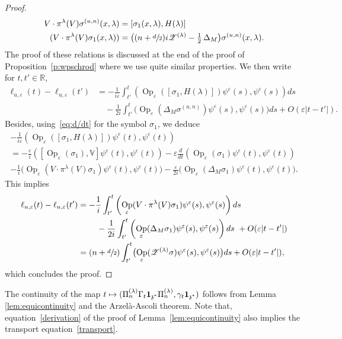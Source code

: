 \documentclass[10pt]{amsart}
\let\mathcal\mathscr
\newcommand\mto{\mathchoice{\longmapsto}{\mapsto}{\mapsto}{\mapsto}}
\newcommand{\bun}{\mathbf{1}}
\DeclareMathOperator{\Op}{Op}
\theoremstyle{plain}
\theoremstyle{definition}
\let\eps\varepsilon
\def\R{{\mathbb R}}
\def\bbV{{\mathbb V}}
\begin{document}
\begin{proof}
\begin{align}
V\cdot \pi^\lambda(V)\sigma^{(u,n)}(x,\lambda)&= [\sigma_1(x,\lambda), H(\lambda)] \label{e:offdiag5}\\
(V\cdot \pi^\lambda(V) \sigma_1(x,\lambda)) &= \bigl((n+\sfrac d2)	i {\mathcal Z}^{(\lambda)} - \tfrac 12\, \Delta_M\bigr) \sigma^{(u,n)}(x,\lambda).	\nonumber
\end{align}
The proof of these relations is discussed at the end of the proof of Proposition~\ref{p:wpschrod} where we use quite similar properties.
We then write for $t,t'\in\R$,
\begin{align*}
\ell_{u,\eps}(t)-\ell_{u,\eps}(t') &= -\frac 1 {i\eps} \int_{t'}^t
\left(\Op_\eps([ \sigma_1,H(\lambda)])\psi^\eps(s),\psi^\eps(s)\right)ds\\
&\quad -\frac 1{2i}
\int_{t'}^t
\bigl(\Op_\eps(\Delta_M \sigma^{(u,n)}) \psi^\eps(s),\psi^\eps(s)\bigr)ds +O(\eps |t-t'|).
\end{align*}
Besides, using~\eqref{eq:d/dt} for the symbol $\sigma_1$, we deduce
\begin{multline*}
-\frac 1{i\eps} \left(\Op_\eps([ \sigma_1,H(\lambda)])\psi^\eps(t),\psi^\eps(t)\right)\\
=-\frac \eps {i} \left([\Op_\eps(\sigma_1),\bbV] \psi^\eps(t),\psi^\eps(t)\right)
-\eps \frac d{dt} \left(\Op_\eps(\sigma_1) \psi^\eps(t),\psi^\eps(t)\right) \\
-\frac 1 i \bigl(\Op_\eps(V\cdot \pi^\lambda(V) \sigma_1) \psi^\eps(t),\psi^\eps(t)\bigr)-\frac \eps {2i} \bigl(\Op_\eps(\Delta_M \sigma_1) \psi^\eps(t),\psi^\eps(t)\bigr).
\end{multline*}
This implies
\begin{equation}
\label{derivation}
\begin{aligned}
\ell_{u,\eps}(t)-\ell_{u,\eps}(t')& = -\frac 1 i \int_{t'}^t \left(\Op_\eps(V\cdot \pi^\lambda(V) \sigma_1) \psi^\eps(s),\psi^\eps(s)\right) ds\\
&
\hspace*{.8cm}-\frac 1{2i}
\int_{t'}^t
\left(\Op_\eps(\Delta_M \sigma_1) \psi^\eps(s),\psi^\eps(s)\right)ds \ +O(\eps |t-t'|)\\
& = (n+\sfrac d 2) \int_{t'}^t \bigl(\Op_\eps(\mathcal Z^{(\lambda)} \sigma) \psi^\eps(s),\psi^\eps(s)\bigr) ds
+O(\eps |t-t'|),
\end{aligned}
\end{equation}
which concludes the proof.
\end{proof}
The continuity of the map $t\mto (\Pi_n^{(\lambda)}\Gamma_t \bun_{\mathfrak z^*}\Pi_n^{(\lambda)},\gamma_t \bun_{\mathfrak z^*})$ follows from Lemma \ref{lem:equicontinuity} and the Arzelà-Ascoli theorem. Note that, equation~\eqref{derivation} of the proof of Lemma~\ref{lem:equicontinuity} also implies the transport equation~\eqref{transport}.
\end{document}
